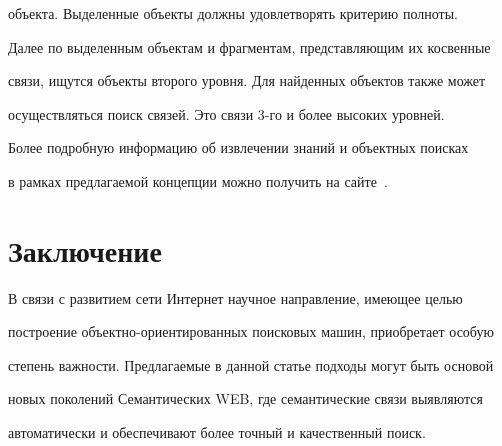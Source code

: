 объекта. Выделенные объекты должны удовлетворять критерию полноты. 


Далее по выделенным объектам и фрагментам, представляющим их косвенные 


связи, ищутся объекты второго уровня. Для найденных объектов также может 


осуществляться поиск связей. Это связи 3-го и более высоких уровней.


    


    Более подробную информацию об извлечении знаний и объектных поисках 


в рамках предлагаемой концепции можно получить на сайте~\cite{12-kuz}. 


    


\section{Заключение }





    В связи с развитием сети Интернет научное направление, имеющее целью 


построение объектно-ориентированных поисковых машин, приобретает особую 


степень важности. Предлагаемые в данной статье подходы могут быть основой 


новых поколений Семантических WEB, где семантические связи выявляются 


автоматически и обеспечивают более точный и качественный поиск.





